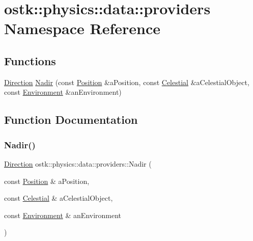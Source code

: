 \hypertarget{namespaceostk_1_1physics_1_1data_1_1providers}{}\section{ostk\+:\+:physics\+:\+:data\+:\+:providers Namespace Reference}
\label{namespaceostk_1_1physics_1_1data_1_1providers}
\subsection*{Functions}
\begin{DoxyCompactItemize}
\item 
\hyperlink{classostk_1_1physics_1_1data_1_1_direction}{Direction} \hyperlink{namespaceostk_1_1physics_1_1data_1_1providers_a752ac9fbe0277ac935ba00efaf304573}{Nadir} (const \hyperlink{classostk_1_1physics_1_1coord_1_1_position}{Position} \&a\+Position, const \hyperlink{classostk_1_1physics_1_1env_1_1obj_1_1_celestial}{Celestial} \&a\+Celestial\+Object, const \hyperlink{classostk_1_1physics_1_1_environment}{Environment} \&an\+Environment)
\end{DoxyCompactItemize}


\subsection{Function Documentation}
\mbox{\label{namespaceostk_1_1physics_1_1data_1_1providers_a752ac9fbe0277ac935ba00efaf304573}} 
\subsubsection{\texorpdfstring{Nadir()}{Nadir()}}
{\footnotesize\ttfamily \hyperlink{classostk_1_1physics_1_1data_1_1_direction}{Direction} ostk\+::physics\+::data\+::providers\+::\+Nadir (\begin{DoxyParamCaption}\item[{const \hyperlink{classostk_1_1physics_1_1coord_1_1_position}{Position} \&}]{a\+Position,  }\item[{const \hyperlink{classostk_1_1physics_1_1env_1_1obj_1_1_celestial}{Celestial} \&}]{a\+Celestial\+Object,  }\item[{const \hyperlink{classostk_1_1physics_1_1_environment}{Environment} \&}]{an\+Environment }\end{DoxyParamCaption})}

